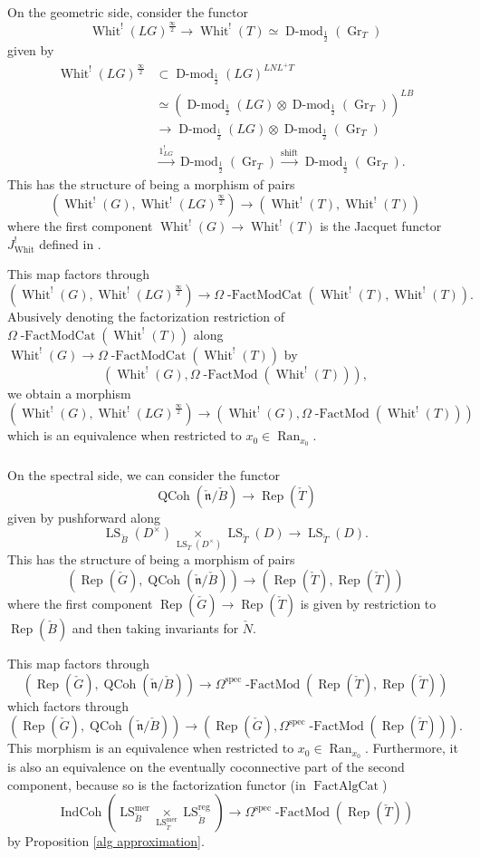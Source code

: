 \documentclass[10pt]{amsart}
\theoremstyle{remark}
\newcommand{\on}[1]{\operatorname{#1}}
\newcommand{\Dmodh}{\on{D-mod}_{\frac{1}{2}}}
\newcommand{\Gcheck}{\check{G}}
\newcommand{\ncheck}{\check{\mathfrak{n}}}
\newcommand{\Bcheck}{\check{B}}
\newcommand{\Tcheck}{\check{T}}
\newcommand{\Ran}{\on{Ran}}
\newcommand{\FactAlgCat}{\on{FactAlgCat}}
\newcommand{\sssec}[1]{\subsubsection{}}
\begin{document}
\sssec{}
On the geometric side, consider the functor
$$
\on{Whit}^!(LG)^{\frac{\infty}{2}} \longrightarrow \on{Whit}^!(T) \simeq \Dmodh(\on{Gr}_T)
$$
given by
\begin{align}
    \on{Whit}^!(LG)^{\frac{\infty}{2}} &\subset \Dmodh(LG)^{LNL^+T} \\
    &\simeq (\Dmodh(LG) \otimes \Dmodh(\on{Gr}_T))^{LB} \\
    &\to \Dmodh(LG) \otimes \Dmodh(\on{Gr}_T) \\
    &\overset{1_{LG}^!}{\to} \Dmodh(\on{Gr}_T) \overset{\on{shift}}{\to} \Dmodh(\on{Gr}_T).
\end{align}
This has the structure of being a morphism of pairs
$$
(\on{Whit}^!(G), \on{Whit}^!(LG)^{\frac{\infty}{2}}) \longrightarrow (\on{Whit}^!(T), \on{Whit}^!(T))
$$
where the first component $\on{Whit}^!(G) \to \on{Whit}^!(T)$ is the Jacquet functor $J_{\on{Whit}}^!$ defined in \cite{GLC3}.

This map factors through
$$
(\on{Whit}^!(G), \on{Whit}^!(LG)^{\frac{\infty}{2}}) \longrightarrow \Omega \on{-FactModCat}(\on{Whit}^!(T), \on{Whit}^!(T)).
$$
Abusively denoting the factorization restriction of $\Omega \on{-FactModCat}(\on{Whit}^!(T))$ along $\on{Whit}^!(G) \to \Omega \on{-FactModCat}(\on{Whit}^!(T))$ by
$$
(\on{Whit}^!(G), \Omega \on{-FactMod}(\on{Whit}^!(T))),
$$
we obtain a morphism
$$
(\on{Whit}^!(G), \on{Whit}^!(LG)^{\frac{\infty}{2}}) \longrightarrow (\on{Whit}^!(G), \Omega \on{-FactMod}(\on{Whit}^!(T)))
$$
which is an equivalence when restricted to $x_0 \in \Ran_{x_0}$.

\sssec{}
On the spectral side, we can consider the functor
$$
\on{QCoh}(\ncheck/\Bcheck) \longrightarrow \on{Rep}(\Tcheck)
$$
given by pushforward along
$$
\on{LS}_{\Bcheck}(D^{\times}) \underset{\on{LS}_{\Tcheck}(D^{\times})}{\times} \on{LS}_{\Tcheck}(D) \longrightarrow \on{LS}_{\Tcheck}(D).
$$
This has the structure of being a morphism of pairs
$$
(\on{Rep}(\Gcheck), \on{QCoh}(\ncheck/\Bcheck)) \longrightarrow (\on{Rep}(\Tcheck), \on{Rep}(\Tcheck))
$$
where the first component $\on{Rep}(\Gcheck) \to \on{Rep}(\Tcheck)$ is given by restriction to $\on{Rep}(\Bcheck)$ and then taking invariants for $\check{N}$.

This map factors through
$$
(\on{Rep}(\Gcheck), \on{QCoh}(\ncheck/\Bcheck)) \longrightarrow \Omega^{\on{spec}}\on{-FactMod}(\on{Rep}(\Tcheck), \on{Rep}(\Tcheck))
$$
which factors through
$$
(\on{Rep}(\Gcheck), \on{QCoh}(\ncheck/\Bcheck)) \longrightarrow (\on{Rep}(\Gcheck), \Omega^{\on{spec}}\on{-FactMod}(\on{Rep}(\Tcheck))).
$$
This morphism is an equivalence when restricted to $x_0 \in \Ran_{x_0}$. Furthermore, it is also an equivalence on the eventually coconnective part of the second component, because so is the factorization functor (in $\FactAlgCat$)
$$
\on{IndCoh}(\on{LS}_{\Bcheck}^{\on{mer}} \underset{\on{LS}_{\Tcheck}^{\on{mer}}}{\times} \on{LS}_{\Bcheck}^{\on{reg}}) \longrightarrow \Omega^{\on{spec}}\on{-FactMod}(\on{Rep}(\Tcheck))
$$
by Proposition \ref{alg approximation}.
\end{document}
